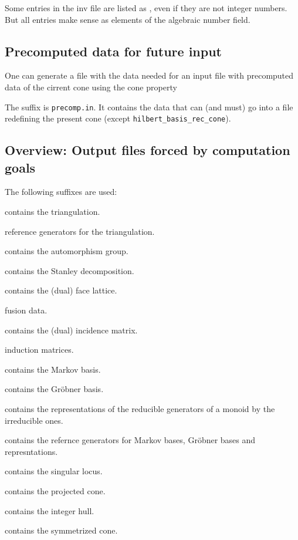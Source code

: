 Some entries in the inv file are listed as , even if they are not integer numbers. But all entries make sense as elements of the algebraic number field.

\subsection{Precomputed data for future input}\label{write_precomp}

One can generate a file with the data needed for an input file with precomputed data of the cirrent cone using the cone property
\begin{itemize}
	\itemtt[WritePreComp]
\end{itemize}
The suffix is \verb|precomp.in|. It contains the data that can (and must) go into a file redefining the present cone (except \verb|hilbert_basis_rec_cone|).

\subsection{Overview: Output files forced by computation goals}\label{forced_out}

The following suffixes are used:

\begin{itemize}
	
	\itemtt[tri] contains the triangulation.
	
	\itemtt[tgn] reference generators for the triangulation.
	
	\itemtt[aut] contains the automorphism group.
	
	\itemtt[dec] contains the Stanley decomposition.
	
	\itemtt[fac] contains the (dual) face lattice.
	
	 \itemtt[fus] fusion data.
	
	\itemtt[inc] contains the (dual) incidence matrix.
	
	 \itemtt[ind] induction matrices.
	
	\itemtt[mrk] contains the Markov basis.
	
	\itemtt[grb] contains the Gröbner basis.
	
	\itemtt[rep] contains the representations of the reducible generators of a monoid by the irreducible ones.
	
	\itemtt[ogn] contains the refernce generators for Markov bases, Gröbner bases and represntations.
	
	\itemtt[sng] contains the singular locus.
	
	 contains the projected cone.
	
	 contains the integer hull.
	
	 contains the symmetrized cone.
	
\end{itemize}

